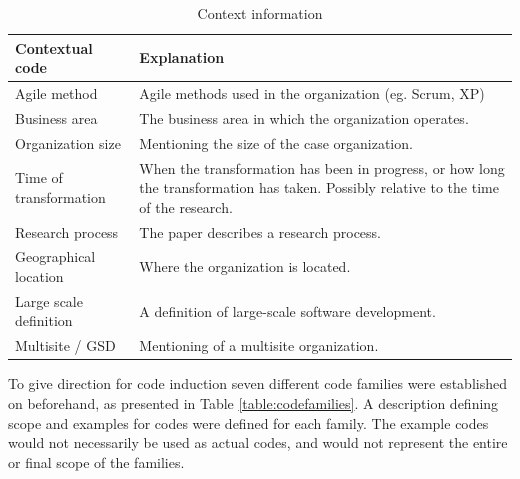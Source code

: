 \documentclass[preprint,authoryear,12pt]{elsarticle}
\begin{document}
\begin{table}[h]
    \centering
    \begin{tabular}{ >{\raggedright\arraybackslash}p{}
                     >{\raggedright\arraybackslash}p{} }
        \toprule
        Contextual code     & Explanation   \\
        \midrule

Agile method & Agile methods used in the organization (eg. Scrum, XP) \\

Business area & The business area in which the organization operates. \\

Organization size & Mentioning the size of the case organization. \\

Time of transformation & When the transformation has been in
progress, or how long the transformation has taken. Possibly relative to
the time of the research. \\

Research process & The paper describes a research process. \\

Geographical location & Where the organization is located. \\

Large scale definition & A definition of large-scale software development. \\

Multisite / GSD & Mentioning of a multisite organization. \\

        \bottomrule
    \end{tabular}
    \caption{Context information}
    \label{table:contextualcodes}
\end{table}

To give direction for code induction seven different code families were
established on beforehand, as presented in Table \ref{table:codefamilies}. A
description defining scope and examples for codes were defined for each family.
The example codes would not necessarily be used as actual codes, and would not
represent the entire or final scope of the families.
\end{document}
